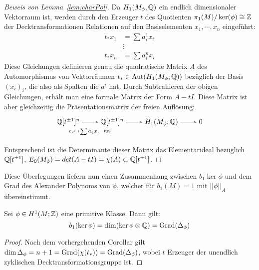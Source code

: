 \begin{proof}[Beweis von Lemma~\ref{lem:charPol}]
	Da $H_1(M_\phi,\mathbb{Q})$ ein endlich dimensionaler Vektorraum ist, werden durch den Erzeuger $t$ des Quotienten $\pi_1(M)/\ker(\phi) \cong \mathbb{Z}$ der Decktransformationen Relationen auf den Basiselementen $x_1,\cdots,x_n$ eingeführt:	
	\begin{align*}
		t_*x_1 &= \sum a_i^1 x_i \\
				&\vdots \\
		t_*x_n &= \sum a_i^n x_i
	\end{align*}
	Diese Gleichungen definieren genau die quadratische Matrix $A$ des Automorphismus von Vektorräumen $t_* \in \operatorname{Aut} (H_1(M_\phi;\mathbb{Q}))$ bezüglich der Basis $(x_i)_i$, die also als Spalten die $a^i$ hat. Durch Subtrahieren der obigen Gleichungen, erhält man eine formale Matrix der Form $A-tI$. Diese Matrix ist aber gleichzeitig die Präsentationsmatrix der freien Auflösung:
	\[
		\begin{xy}
			\xymatrix@L+5pt{\laurent \QQ t ^n \ar[r]_{e_r\mapsto \sum a_i^rx_i-tx_r} & \laurent \QQ t ^n \ar[r] & H_1(M_\phi;\QQ) \ar[r] &0\\}
		\end{xy}
	\]
	Entsprechend ist die Determinante dieser Matrix das Elementarideal bezüglich $\mathbb{Q}[t^{\pm 1}]$, $E_0(M_\phi)=det(A-tI)=\chi(A) \subset \mathbb{Q}[t^{\pm 1}] $. 
\end{proof}



Diese Überlegungen liefern nun einen Zusammenhang zwischen $b_1\ker\phi$ und dem Grad des Alexander Polynoms von $\phi$, welcher für $b_1(M)=1$ mit $||\phi||_A$ übereinstimmt. 
\begin{cor}
\label{cor:degreealex}
	Sei $\phi \in H^1(M;\mathbb{Z})$ eine primitive Klasse. Dann gilt:
	\[
		b_1(\ker\phi)=\dim(\ker\phi \otimes \mathbb{Q}) = \operatorname{Grad}(\Delta_\phi) 
	\]
\end{cor}
\begin{proof}
	Nach dem vorhergehenden Corollar gilt $\dim \Delta_\phi = n+1 = \operatorname{Grad}(\chi(t_*)) = \operatorname{Grad}(\Delta_\phi)$, wobei $t$ Erzeuger der unendlich zyklischen Decktransformationsgruppe ist. 
\end{proof}


